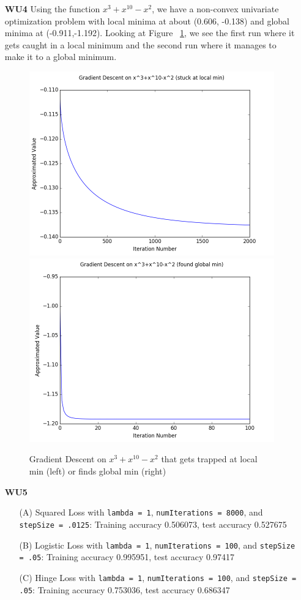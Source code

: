\documentclass{article}
\begin{document}
\begin{enumerate}
	\item[\textbf{WU4}] 
Using the function $x^3+x^{10}-x^2$, we have a non-convex univariate optimization problem with local minima at about (0.606, -0.138) and global minima at (-0.911,-1.192). Looking at Figure ~\ref{fig:WU3}, we see the first run where it gets caught in a local minimum and the second run  where it manages to make it to a global minimum.

\begin{figure}[htp]
\centering
\includegraphics[width=.5\textwidth]{gd_local_min.png}\hfill
\includegraphics[width=.5\textwidth]{gd_global_min.png}
\caption{Gradient Descent on $x^3+x^{10}-x^2$ that gets trapped at local min (left) or finds global min (right)}
\label{fig:WU3}
\end{figure}

	\item[\textbf{WU5}] 
	
	\begin{enumerate}
		\item[(A)] Squared Loss with \texttt{lambda = 1}, \texttt{numIterations = 8000}, and \texttt{stepSize = .0125}: Training accuracy 0.506073, test accuracy 0.527675
		\item[(B)] Logistic Loss with \texttt{lambda = 1}, \texttt{numIterations = 100}, and \texttt{stepSize = .05}: Training accuracy 0.995951, test accuracy 0.97417
		\item[(C)] Hinge Loss with \texttt{lambda = 1}, \texttt{numIterations = 100}, and \texttt{stepSize = .05}: Training accuracy 0.753036, test accuracy 0.686347 
		

\end{enumerate}
\end{enumerate}
\end{document}
